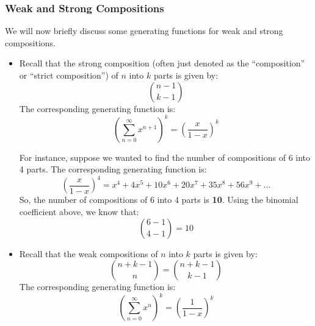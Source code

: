 \documentclass[letterpaper]{article}
\begin{document}
\subsubsection{Weak and Strong Compositions}
We will now briefly discuss some generating functions for weak and strong compositions. 
\begin{itemize}
    \item Recall that the strong composition (often just denoted as the ``composition'' or ``strict composition'') of $n$ into $k$ parts is given by:
    \[\binom{n - 1}{k - 1}\]
    The corresponding generating function is:
    \[\left(\sum_{n = 0}^{\infty} x^{n + 1}\right)^k = \left(\frac{x}{1 - x}\right)^k\]

    For instance, suppose we wanted to find the number of compositions of 6 into 4 parts. The corresponding generating function is:
    \[\left(\frac{x}{1 - x}\right)^4 = x^4 + 4x^5 + \boxed{10x^6} + 20x^7 + 35x^8 + 56x^9 + \dots\]
    So, the number of compositions of 6 into 4 parts is \textbf{10}. Using the binomial coefficient above, we know that:
    \[\binom{6 - 1}{4 - 1} = 10\]

    \item Recall that the weak compositions of $n$ into $k$ parts is given by:
    \[\binom{n + k - 1}{n} = \binom{n + k - 1}{k - 1}\]
    The corresponding generating function is:
    \[\left(\sum_{n = 0}^{\infty} x^n\right)^k = \left(\frac{1}{1 - x}\right)^k\]
\end{itemize}
\end{document}
